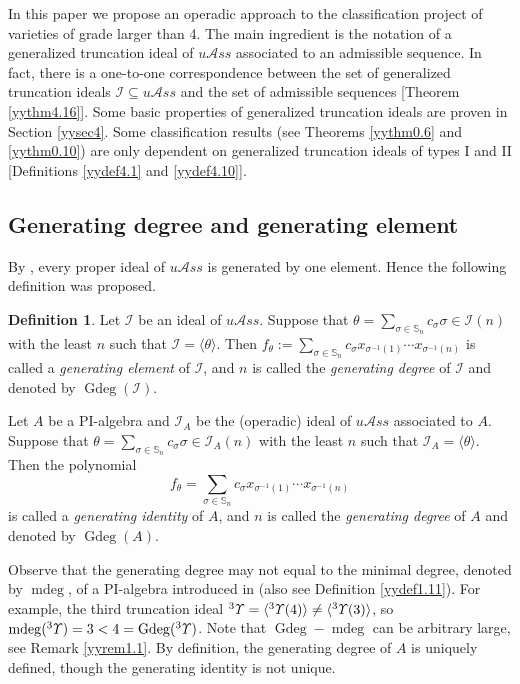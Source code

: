 \documentclass{amsart}
\theoremstyle{definition}
\newtheorem{Def}[thm]{Definition}
\theoremstyle{remark}
\numberwithin{equation}{section}
\def\S{\mathbb{S}}
\def\gd{\operatorname{Gdeg}}
\def\mdeg{\operatorname{mdeg}}
\newcommand{\lr}[1]{\langle #1 \rangle}
\newcommand{\up}[1]{{^{#1}{\it \!\Upsilon}}}
\def \uas{u\mathcal{A}ss}
\def \I{\mathcal{I}}
\def \S{\mathbb{S}}
\begin{document}
In this paper we propose an operadic approach to the 
classification project of varieties of grade larger than 
4. The main ingredient is the notation of a generalized 
truncation ideal of $\uas$ associated to an admissible 
sequence. In fact, there is a one-to-one correspondence 
between the set of generalized truncation ideals 
$\I \subseteq \uas$ and the set of admissible sequences 
[Theorem \ref{yythm4.16}]. Some basic properties of 
generalized truncation ideals are proven in Section 
\ref{yysec4}. Some classification results (see
Theorems \ref{yythm0.6} and \ref{yythm0.10}) are only 
dependent on generalized truncation ideals of types I
and II [Definitions \ref{yydef4.1} and \ref{yydef4.10}].

\subsection{Generating degree and generating element}
\label{yysec0.6}
By \cite[Theorem 0.3(2)]{BXYZZ}, every proper ideal of 
$\uas$ is generated by one element. Hence the following
definition was proposed.

\begin{Def}\cite[Definition 0.4]{BXYZZ}
\label{yydef0.7}
Let $\I$ be an ideal of $\uas$. Suppose that 
$\theta=\sum_{\sigma\in \S_n}c_\sigma \sigma\in \I(n)$ 
with the least $n$ such that $\I=\lr{\theta}$. Then 
$f_\theta:=\sum_{\sigma\in \S_n}c_\sigma 
x_{\sigma^{-1}(1)}\cdots x_{\sigma^{-1}(n)}$ is called a 
\textit{generating element} of $\I$, and $n$ is called 
the \textit{generating degree} of $\I$ and denoted by
$\gd(\I)$. 


Let $A$ be a PI-algebra and $\I_A$ be the (operadic) ideal 
of $\uas$ associated to $A$. Suppose that 
$\theta=\sum_{\sigma\in \S_n}c_\sigma \sigma\in \I_A(n)$ 
with the least $n$ such that $\I_A=\lr{\theta}$. Then the 
polynomial 
$$f_\theta=\sum_{\sigma\in \S_n}c_\sigma 
x_{\sigma^{-1}(1)}\cdots x_{\sigma^{-1}(n)}$$ is called a 
\textit{generating identity} of $A$, and $n$ is called 
the \textit{generating degree} of $A$ and denoted by
$\gd(A)$. 
\end{Def}

Observe that the generating degree may not equal to the 
minimal degree, denoted by $\mdeg$, of a PI-algebra 
introduced in \cite{AL} (also see Definition \ref{yydef1.11}). 
For example, the third truncation ideal 
$\up{3}=\lr{\up{3}(4)}\neq \lr{\up{3}(3)}$, so
$\mdeg(\up{3})=3<4=\gd(\up{3})$. Note that $\gd-\mdeg$
can be arbitrary large, see Remark \ref{yyrem1.1}.
By definition, the generating 
degree of $A$ is uniquely defined, though the generating 
identity is not unique. 
\end{document}
